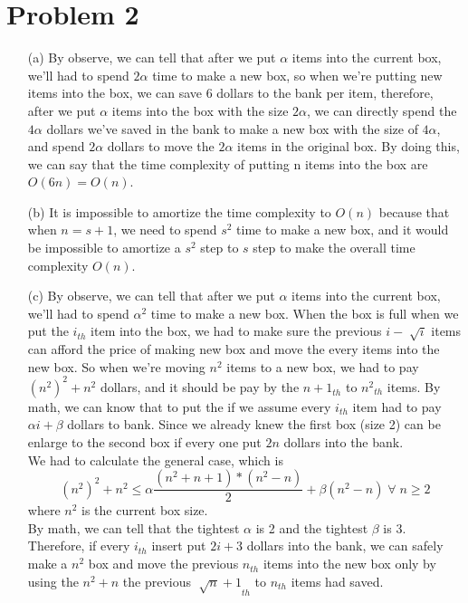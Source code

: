 \documentclass{homework}
\begin{document}
\section*{Problem 2}
\begin{itemize}
    \item[(a)]
    By observe, we can tell that after we put $\alpha$ items into the current box, we'll had to spend $2\alpha$ time to make a new box, so when we're putting new items into the box, we can save 6 dollars to the bank per item, therefore, after we put $\alpha$ items into the box with the size $2\alpha$, we can directly spend the $4\alpha$ dollars we've saved in the bank to make a new box with the size of $4\alpha$, and spend $2\alpha$ dollars to move the $2\alpha$ items in the original box. By doing this, we can say that the time complexity of putting n items into the box are $O(6n) = O(n)$. 
    
    \item[(b)]
    It is impossible to amortize the time complexity to $O(n)$ because that when $n = s + 1$, we need to spend $s^2$ time to make a new box, and it would be impossible to amortize a $s^2$ step to $s$ step to make the overall time complexity $O(n)$.

    \item[(c)]
    By observe, we can tell that after we put $\alpha$ items into the current box, we'll had to spend $\alpha^2$ time to make a new box. When the box is full when we put the $i_{th}$ item into the box, we had to make sure the previous $i-\sqrt[]{i}$ items can afford the price of making new box and move the every items into the new box. So when we're moving $n^2$ items to a new box, we had to pay ${(n^2)}^2+n^2$ dollars, and it should be pay by the ${n+1}_{th}$ to ${n^2}_{th}$ items. By math, we can know that to put the if we assume every $i_{th}$ item had to pay $\alpha i +\beta$ dollars to bank. Since we already knew the first box (size 2) can be enlarge to the second box if every one put $2n$ dollars into the bank.\\
    We had to calculate the general case, which is 
    \[{(n^2)}^2+n^2 \leq \alpha \frac{(n^2+n+1)*(n^2-n)}{2} + \beta (n^2-n)\;\forall\; n \geq 2\]
    where $n^2$ is the current box size.\\
    By math, we can tell that the tightest $\alpha$ is 2 and the tightest $\beta$ is 3. Therefore, if every $i_{th}$ insert put $2i+3$ dollars into the bank, we can safely make a $n^2$ box and move the previous $n_{th}$ items into the new box only by using the ${n}^2+n$ the previous ${\sqrt[]{n}+1}_{th}$ to $n_{th}$ items had saved.


\end{itemize}
\end{document}
